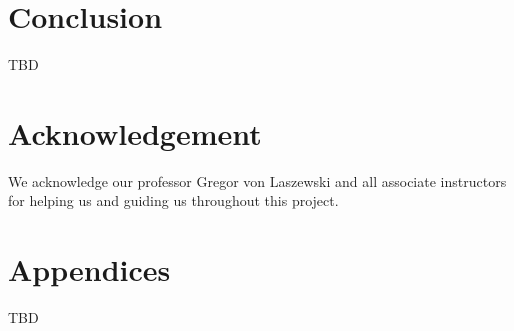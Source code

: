 \documentclass[9pt,twocolumn,twoside]{../../styles/osajnl}
\begin{document}
\section{Conclusion}

TBD

\section{Acknowledgement}

We acknowledge our professor Gregor von Laszewski and all associate
instructors for helping us and guiding us throughout this project.

\section{Appendices}
TBD


 
\end{document}
